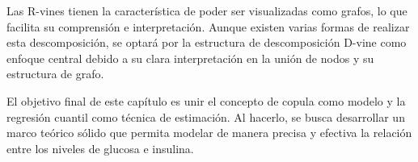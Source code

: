 Las R-vines tienen la característica de poder ser visualizadas como grafos, lo que facilita su comprensión e interpretación. Aunque existen varias formas de realizar esta descomposición, se optará por la estructura de descomposición D-vine como enfoque central debido a su clara interpretación en la unión de nodos y su estructura de grafo.

El objetivo final de este capítulo es unir el concepto de copula como modelo y la regresión cuantil como técnica de estimación. Al hacerlo, se busca desarrollar un marco teórico sólido que permita modelar de manera precisa y efectiva la relación entre los niveles de glucosa e insulina.


